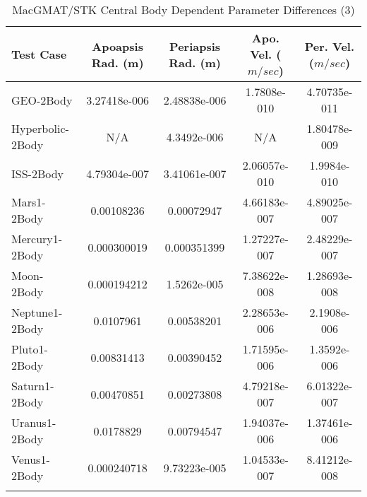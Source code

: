 \begin{table}[htbp!]
\centering
\caption{ MacGMAT/STK Central Body Dependent Parameter Differences (3)}
      \begin{tabular}{lcccc}
      \hline\hline
          Test Case & Apoapsis Rad. (m) & Periapsis Rad. (m) & Apo. Vel. ($m/sec$) & Per. Vel. ($m/sec$) \\
         \hline
         GEO-2Body & 3.27418e-006 & 2.48838e-006 & 1.7808e-010 & 4.70735e-011 \\
         Hyperbolic-2Body & N/A & 4.3492e-006 & N/A & 1.80478e-009 \\
         ISS-2Body & 4.79304e-007 & 3.41061e-007 & 2.06057e-010 & 1.9984e-010 \\
         Mars1-2Body & 0.00108236 & 0.00072947 & 4.66183e-007 & 4.89025e-007 \\
         Mercury1-2Body & 0.000300019 & 0.000351399 & 1.27227e-007 & 2.48229e-007 \\
         Moon-2Body & 0.000194212 & 1.5262e-005 & 7.38622e-008 & 1.28693e-008 \\
         Neptune1-2Body & 0.0107961 & 0.00538201 & 2.28653e-006 & 2.1908e-006 \\
         Pluto1-2Body & 0.00831413 & 0.00390452 & 1.71595e-006 & 1.3592e-006 \\
         Saturn1-2Body & 0.00470851 & 0.00273808 & 4.79218e-007 & 6.01322e-007 \\
         Uranus1-2Body & 0.0178829 & 0.00794547 & 1.94037e-006 & 1.37461e-006 \\
         Venus1-2Body & 0.000240718 & 9.73223e-005 & 1.04533e-007 & 8.41212e-008 \\
      \hline\hline
      \label{Table: MacGMAT-STK CB Parameters Set 3} 
\end{tabular}
\end{table}
